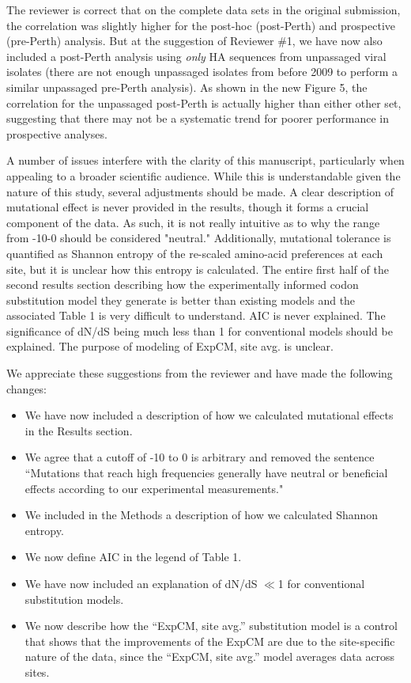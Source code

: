 \documentclass[11pt, oneside]{article}   	%
\newcommand{\response}[1]{{\color{black}#1}}
\begin{document}
\response{
The reviewer is correct that on the complete data sets in the original submission, the correlation was slightly higher for the post-hoc (post-Perth) and prospective (pre-Perth) analysis.
But at the suggestion of Reviewer \#1, we have now also included a post-Perth analysis using \emph{only} HA sequences from unpassaged viral isolates (there are not enough unpassaged isolates from before 2009 to perform a similar unpassaged pre-Perth analysis).
As shown in the new Figure 5, the correlation for the unpassaged post-Perth is actually higher than either other set, suggesting that there may not be a systematic trend for poorer performance in prospective analyses.
}

A number of issues interfere with the clarity of this manuscript, particularly when appealing to a broader scientific audience. While this is understandable given the nature of this study, several adjustments should be made. A clear description of mutational effect is never provided in the results, though it forms a crucial component of the data. As such, it is not really intuitive as to why the range from -10-0 should be considered "neutral." Additionally, mutational tolerance is quantified as Shannon entropy of the re-scaled amino-acid preferences at each site, but it is unclear how this entropy is calculated. The entire first half of the second results section describing how the experimentally informed codon substitution model they generate is better than existing models and the associated Table 1 is very difficult to understand. AIC is never explained. The significance of dN/dS being much less than 1 for conventional models should be explained. The purpose of modeling of ExpCM, site avg. is unclear. 

\response{We appreciate these suggestions from the reviewer and have made the following changes:
\begin{itemize}
\item We have now included a description of how we calculated mutational effects in the Results section.
\item We agree that a cutoff of -10 to 0 is arbitrary and removed the sentence ``Mutations that reach high frequencies generally have neutral or beneficial effects according to our experimental measurements." 
\item We included in the Methods a description of how we calculated Shannon entropy.
\item We now define AIC in the legend of Table 1.
\item We have now included an explanation of dN/dS $\ll$1 for conventional substitution models.
\item We now describe how the ``ExpCM, site avg.'' substitution model is a control that shows that the improvements of the ExpCM are due to the site-specific nature of the data, since the ``ExpCM, site avg.'' model averages data across sites.
\end{itemize}
}
\end{document}

